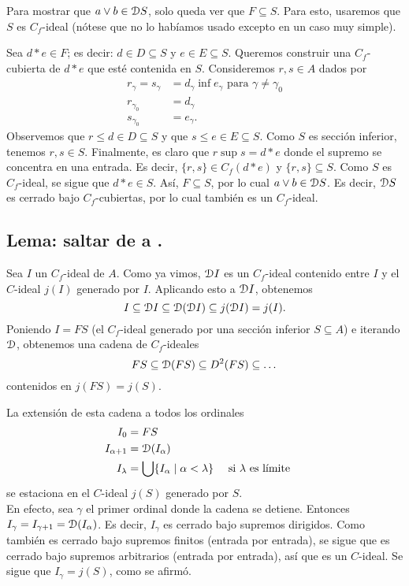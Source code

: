 Para mostrar que $a\sup b\in\D S$,
solo queda ver que $F\subseteq S$.
Para esto, usaremos que $S$ es $C_f$-ideal (nótese que no lo
habíamos usado excepto en un caso muy simple).

Sea $d*e\in F$; es decir: $d\in D\subseteq S$ y $e\in E\subseteq S$.
Queremos construir una $C_f$-cubierta de $d*e$ que esté contenida
en $S$.
Consideremos  $r,s\in A$ dados por
\begin{align*}
  r_\gamma = s_\gamma
    &= d_\gamma \inf e_\gamma \text{ para } \gamma\neq\gamma_0 \\
  r_{\gamma_0} &= d_\gamma \\
  s_{\gamma_0} &= e_\gamma.
\end{align*}
Observemos que $r\leq d\in D\subseteq S$ y que $s\leq e\in
E\subseteq S$.
Como $S$ es sección inferior, tenemos $r,s\in S$.
Finalmente, es claro que $r\sup s = d*e$ donde el supremo se
concentra en una entrada.
Es decir, $\{r,s\}\in C_f(d*e)$ y $\{r,s\}\subseteq S$.
Como $S$ es $C_f$-ideal, se sigue que $d*e\in S$.
Así, $F\subseteq S$, por lo cual $a\sup b\in\D S$.
Es decir, $\D S$ es cerrado bajo $C_f$-cubiertas, por lo cual
también es un $C_f$-ideal.

\subsection{Lema: saltar de  a .}
    Sea $I$ un $C_f$-ideal de $A$.
    Como ya vimos, $\D I$ es un $C_f$-ideal contenido
    entre $I$ y el $C$-ideal $j(I)$ generado por $I$.
    Aplicando esto a $\D I$, obtenemos
    \[
        I\subseteq \D I
        \subseteq \D(\D I)
        \subseteq j(\D I)=j(I)
    .\]
    Poniendo $I=FS$ (el $C_f$-ideal generado por una sección
    inferior $S\subseteq A$) e iterando $\D$, obtenemos una
    cadena de $C_f$-ideales
    \[
        FS \subseteq \cal D(FS)
        \subseteq D^2(FS)
        \subseteq \dots
    \]
    contenidos en $j(FS)=j(S)$.


    La extensión de esta cadena a todos los ordinales
    \begin{align*}
        I_0 &= FS \\
        I_{\alpha+1} &= \D(I_\alpha) \\
        I_\lambda
        &= \bigcup\{I_\alpha \mid \alpha<\lambda\}
            && \text{ si $\lambda$ es límite }
    \end{align*}
    se estaciona en el $C$-ideal $j(S)$ generado por $S$. \\
    En efecto, sea $\gamma$ el primer ordinal donde la cadena
    se detiene.
    Entonces $I_\gamma=I_{\gamma+1}=\D(I_\alpha)$.
    Es decir, $I_\gamma$ es cerrado bajo supremos dirigidos.
    Como también es cerrado bajo supremos finitos
    (entrada por entrada), se sigue
    que es cerrado bajo supremos arbitrarios
    (entrada por entrada), así que es
    un $C$-ideal.
    Se sigue que $I_\gamma=j(S)$, como se afirmó.



